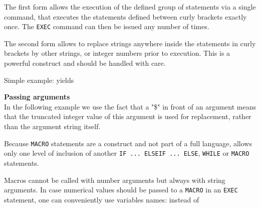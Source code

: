 
The first form allows the execution of the defined group of statements via a
single command,  
that executes the statements defined between curly brackets exactly
once. The \texttt{EXEC} command can then be issued any number of times.  

The second form allows to replace strings anywhere inside the statements
in curly brackets by other strings, or integer numbers prior to
execution. This is a powerful construct and should be handled with care.  

Simple example: 
yields

\textbf{Passing arguments}\\
In the following example we use the fact that a "\$" in front of an
argument means that the truncated integer value of this argument is used
for replacement, rather than the argument string itself.  


Because \texttt{MACRO} statements are a \madx construct and not part of
a full language, \madx  allows only one level of inclusion of another
\texttt{IF ... ELSEIF ... ELSE}, \texttt{WHILE} or \texttt{MACRO}
statements.   


Macros cannot be called with number arguments but always with string
arguments. In case numerical values should be passed to a \texttt{MACRO}
in an \texttt{EXEC} statement, one can conveniently use variables names: 
instead of 

